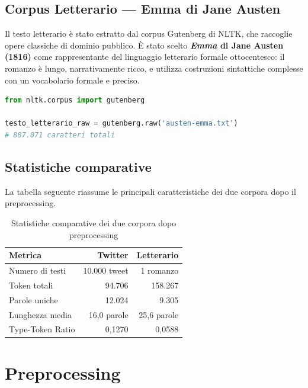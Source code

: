 \documentclass[12pt, a4paper]{article}
\begin{document}
\subsection{Corpus Letterario --- Emma di Jane Austen}

Il testo letterario è stato estratto dal corpus Gutenberg di NLTK,
che raccoglie opere classiche di dominio pubblico. È stato scelto
\textbf{\textit{Emma} di Jane Austen (1816)} come rappresentante
del linguaggio letterario formale ottocentesco: il romanzo è lungo,
narrativamente ricco, e utilizza costruzioni sintattiche complesse
con un vocabolario formale e preciso.

\begin{lstlisting}[language=Python, caption=Caricamento del corpus letterario]
from nltk.corpus import gutenberg

testo_letterario_raw = gutenberg.raw('austen-emma.txt')
# 887.071 caratteri totali
\end{lstlisting}

\subsection{Statistiche comparative}

La tabella seguente riassume le principali caratteristiche dei due corpora
dopo il preprocessing.

\begin{table}[H]
\centering
\begin{tabular}{lrr}
\toprule
\textbf{Metrica} & \textbf{Twitter} & \textbf{Letterario} \\
\midrule
Numero di testi      & 10.000 tweet & 1 romanzo \\
Token totali         & 94.706       & 158.267 \\
Parole uniche        & 12.024       & 9.305 \\
Lunghezza media      & 16,0 parole  & 25,6 parole \\
Type-Token Ratio     & 0,1270       & 0,0588 \\
\bottomrule
\end{tabular}
\caption{Statistiche comparative dei due corpora dopo preprocessing}
\end{table}

\section{Preprocessing}
\end{document}
